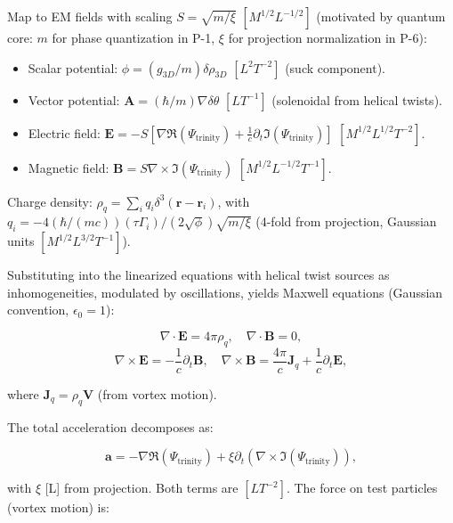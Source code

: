 Map to EM fields with scaling $S = \sqrt{m / \xi}$ $[M^{1/2} L^{-1/2}]$ (motivated by quantum core: $m$ for phase quantization in P-1, $\xi$ for projection normalization in P-6):

\begin{itemize}
\item Scalar potential: $\phi = (g_{3D} / m) \delta \rho_{3D}$ $[L^2 T^{-2}]$ (suck component).
\item Vector potential: $\mathbf{A} = (\hbar / m) \nabla \delta \theta$ $[L T^{-1}]$ (solenoidal from helical twists).
\item Electric field: $\mathbf{E} = -S \left[ \nabla \Re(\Psi_{\text{trinity}}) + \frac{1}{c} \partial_t \Im(\Psi_{\text{trinity}}) \right]$ $[M^{1/2} L^{1/2} T^{-2}]$.
\item Magnetic field: $\mathbf{B} = S \nabla \times \Im(\Psi_{\text{trinity}})$ $[M^{1/2} L^{-1/2} T^{-1}]$.
\end{itemize}

Charge density: $\rho_q = \sum_i q_i \delta^3(\mathbf{r} - \mathbf{r}_i)$, with $q_i = -4 (\hbar / (m c)) (\tau \Gamma_i) / (2 \sqrt{\phi}) \sqrt{m / \xi}$ (4-fold from projection, Gaussian units $[M^{1/2} L^{3/2} T^{-1}]$).

Substituting into the linearized equations with helical twist sources as inhomogeneities, modulated by oscillations, yields Maxwell equations (Gaussian convention, $\epsilon_0 = 1$):

\begin{equation}
\nabla \cdot \mathbf{E} = 4\pi \rho_q, \quad \nabla \cdot \mathbf{B} = 0,
\end{equation}
\begin{equation}
\nabla \times \mathbf{E} = -\frac{1}{c} \partial_t \mathbf{B}, \quad \nabla \times \mathbf{B} = \frac{4\pi}{c} \mathbf{J}_q + \frac{1}{c} \partial_t \mathbf{E},
\end{equation}

where $\mathbf{J}_q = \rho_q \mathbf{V}$ (from vortex motion).

The total acceleration decomposes as:

\begin{equation}
\mathbf{a} = -\nabla \Re(\Psi_{\text{trinity}}) + \xi \partial_t (\nabla \times \Im(\Psi_{\text{trinity}})),
\end{equation}

with $\xi$ [L] from projection. Both terms are $[L T^{-2}]$. The force on test particles (vortex motion) is:

